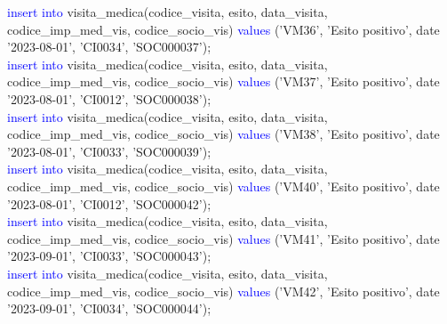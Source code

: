 \documentclass{article}
\begin{document}
\begin{flushleft}
{        \vspace{2mm}
        \hspace*{0.5em}\textcolor{blue}{insert into} visita\_medica(codice\_visita, esito, data\_visita, codice\_imp\_med\_vis, \hspace*{0.5em}codice\_socio\_vis) \textcolor{blue}{values} ('VM36', 'Esito positivo', date '2023-08-01', 'CI0034', \hspace*{0.5em}'SOC000037'); \\
        \vspace{2mm}
        \hspace*{0.5em}\textcolor{blue}{insert into} visita\_medica(codice\_visita, esito, data\_visita, codice\_imp\_med\_vis, \hspace*{0.5em}codice\_socio\_vis) \textcolor{blue}{values} ('VM37', 'Esito positivo', date '2023-08-01', 'CI0012', \hspace*{0.5em}'SOC000038'); \\
        \vspace{2mm}
        \hspace*{0.5em}\textcolor{blue}{insert into} visita\_medica(codice\_visita, esito, data\_visita, codice\_imp\_med\_vis, \hspace*{0.5em}codice\_socio\_vis) \textcolor{blue}{values} ('VM38', 'Esito positivo', date '2023-08-01', 'CI0033', \hspace*{0.5em}'SOC000039'); \\
        \vspace{2mm}
        \hspace*{0.5em}\textcolor{blue}{insert into} visita\_medica(codice\_visita, esito, data\_visita, codice\_imp\_med\_vis, \hspace*{0.5em}codice\_socio\_vis) \textcolor{blue}{values} ('VM40', 'Esito positivo', date '2023-08-01', 'CI0012', \hspace*{0.5em}'SOC000042'); \\
        \vspace{2mm}
        \hspace*{0.5em}\textcolor{blue}{insert into} visita\_medica(codice\_visita, esito, data\_visita, codice\_imp\_med\_vis, \hspace*{0.5em}codice\_socio\_vis) \textcolor{blue}{values} ('VM41', 'Esito positivo', date '2023-09-01', 'CI0033', \hspace*{0.5em}'SOC000043'); \\
        \vspace{2mm}
        \hspace*{0.5em}\textcolor{blue}{insert into} visita\_medica(codice\_visita, esito, data\_visita, codice\_imp\_med\_vis, \hspace*{0.5em}codice\_socio\_vis) \textcolor{blue}{values} ('VM42', 'Esito positivo', date '2023-09-01', 'CI0034', \hspace*{0.5em}'SOC000044'); \\
}
\end{flushleft}
\end{document}
